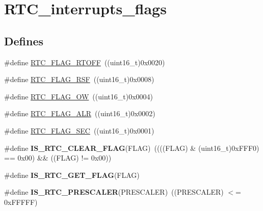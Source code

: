 \hypertarget{group__RTC__interrupts__flags}{
\section{RTC\_\-interrupts\_\-flags}
\label{group__RTC__interrupts__flags}
}
\subsection*{Defines}
\begin{DoxyCompactItemize}
\item 
\#define \hyperlink{group__RTC__interrupts__flags_ga203dcbb991497e4d0e6722815f6db942}{RTC\_\-FLAG\_\-RTOFF}~((uint16\_\-t)0x0020)
\item 
\#define \hyperlink{group__RTC__interrupts__flags_ga78c4245996bef8d5f39226b6e37ed9c0}{RTC\_\-FLAG\_\-RSF}~((uint16\_\-t)0x0008)
\item 
\#define \hyperlink{group__RTC__interrupts__flags_ga4e321e359b914d7ed10eed985f8b4811}{RTC\_\-FLAG\_\-OW}~((uint16\_\-t)0x0004)
\item 
\#define \hyperlink{group__RTC__interrupts__flags_gaed4375a7ea5a147f83c6cf4bfa805caf}{RTC\_\-FLAG\_\-ALR}~((uint16\_\-t)0x0002)
\item 
\#define \hyperlink{group__RTC__interrupts__flags_ga8babb2c823c2097bf4a4ef0c20ef7367}{RTC\_\-FLAG\_\-SEC}~((uint16\_\-t)0x0001)
\item 
\hypertarget{group__RTC__interrupts__flags_ga5f8a9327a258f16f29703fa3e3cc8af7}{
\#define {\bfseries IS\_\-RTC\_\-CLEAR\_\-FLAG}(FLAG)~((((FLAG) \& (uint16\_\-t)0xFFF0) == 0x00) \&\& ((FLAG) != 0x00))}
\label{group__RTC__interrupts__flags_ga5f8a9327a258f16f29703fa3e3cc8af7}

\item 
\#define {\bfseries IS\_\-RTC\_\-GET\_\-FLAG}(FLAG)
\item 
\hypertarget{group__RTC__interrupts__flags_ga483b9ec67246cbfb2874c5a85f0cb4d8}{
\#define {\bfseries IS\_\-RTC\_\-PRESCALER}(PRESCALER)~((PRESCALER) $<$= 0xFFFFF)}
\label{group__RTC__interrupts__flags_ga483b9ec67246cbfb2874c5a85f0cb4d8}

\end{DoxyCompactItemize}


